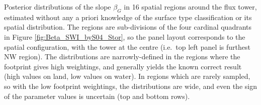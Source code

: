 \label{fig:Beta_SWI_byS16_Stor} Posterior distributions of the
slope \(\beta_{G}\) in 16 spatial regions around the flux tower,
estimated without any a priori knowledge of the surface type
classification or its spatial distribution. The regions are
sub-divisions of the four cardinal quadrants in Figure
\ref{fig:Beta_SWI_byS04_Stor}, so the panel layout corresponds to the
spatial configuration, with the tower at the centre (i.e.~top left panel
is furthest NW region). The distributions are narrowly-defined in the
regions where the footprint gives high weightings, and generally yields
the known correct result (high values on land, low values on water). In
regions which are rarely sampled, so with the low footprint weightings,
the distributions are wide, and even the sign of the parameter values is
uncertain (top and bottom rows).